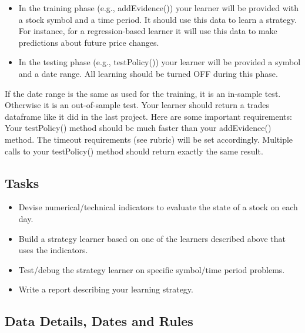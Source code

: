 \documentclass[11pt]{article}
\providecommand{\tightlist}{%
      \setlength{\itemsep}{0pt}\setlength{\parskip}{0pt}}
\begin{document}
\begin{itemize}
\tightlist
\item
  In the training phase (e.g., addEvidence()) your learner will be
  provided with a stock symbol and a time period. It should use this
  data to learn a strategy. For instance, for a regression-based learner
  it will use this data to make predictions about future price changes.
\item
  In the testing phase (e.g., testPolicy()) your learner will be
  provided a symbol and a date range. All learning should be turned OFF
  during this phase.
\end{itemize}

If the date range is the same as used for the training, it is an
in-sample test. Otherwise it is an out-of-sample test. Your learner
should return a trades dataframe like it did in the last project. Here
are some important requirements: Your testPolicy() method should be much
faster than your addEvidence() method. The timeout requirements (see
rubric) will be set accordingly. Multiple calls to your testPolicy()
method should return exactly the same result.

    \subsection{Tasks}\label{tasks}

\begin{itemize}
\tightlist
\item
  Devise numerical/technical indicators to evaluate the state of a stock
  on each day.
\item
  Build a strategy learner based on one of the learners described above
  that uses the indicators.
\item
  Test/debug the strategy learner on specific symbol/time period
  problems.
\item
  Write a report describing your learning strategy.
\end{itemize}

    \subsection{Data Details, Dates and
Rules}\label{data-details-dates-and-rules}
\end{document}
